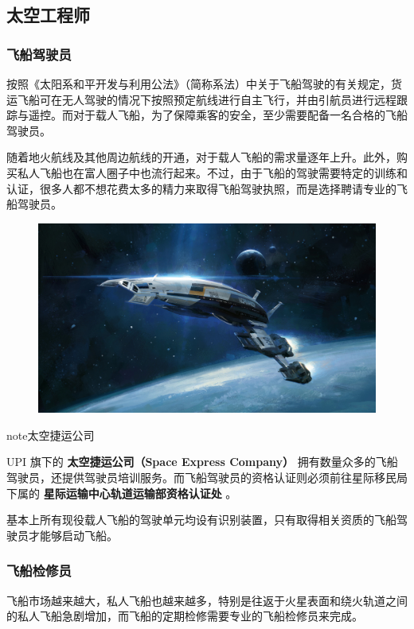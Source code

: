 \documentclass[letterpaper,10pt]{sphinxmanual}
\begin{document}
\subsection{太空工程师}
\label{profession:id2}

\subsubsection{飞船驾驶员}
\label{profession:id3}
按照《太阳系和平开发与利用公法》（简称系法）中关于飞船驾驶的有关规定，货运飞船可在无人驾驶的情况下按照预定航线进行自主飞行，并由引航员进行远程跟踪与遥控。而对于载人飞船，为了保障乘客的安全，至少需要配备一名合格的飞船驾驶员。

随着地火航线及其他周边航线的开通，对于载人飞船的需求量逐年上升。此外，购买私人飞船也在富人圈子中也流行起来。不过，由于飞船的驾驶需要特定的训练和认证，很多人都不想花费太多的精力来取得飞船驾驶执照，而是选择聘请专业的飞船驾驶员。
\begin{figure}[htbp]
\centering

\includegraphics{290500.jpg}
\end{figure}

\begin{notice}{note}{太空捷运公司}

UPI 旗下的 \textbf{太空捷运公司（Space Express Company）} 拥有数量众多的飞船驾驶员，还提供驾驶员培训服务。而飞船驾驶员的资格认证则必须前往星际移民局下属的 \textbf{星际运输中心轨道运输部资格认证处} 。
\end{notice}

基本上所有现役载人飞船的驾驶单元均设有识别装置，只有取得相关资质的飞船驾驶员才能够启动飞船。


\subsubsection{飞船检修员}
\label{profession:id4}
飞船市场越来越大，私人飞船也越来越多，特别是往返于火星表面和绕火轨道之间的私人飞船急剧增加，而飞船的定期检修需要专业的飞船检修员来完成。
\end{document}
